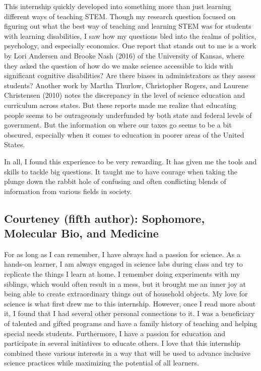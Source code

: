 \documentclass[11.5pt]{sig-alternate}
\begin{document}
\begin{large}
This internship quickly developed into something more than just learning different ways of teaching STEM. Though my research question focused on figuring out what the best way of teaching and learning STEM was for students with learning disabilities, I saw how my questions bled into the realms of politics, psychology, and especially economics. One report that stands out to me is a work by Lori Andersen and Brooke Nash (2016) of the University of Kansas, where they asked the question of how do we make science accessible to kids with significant cognitive disabilities? Are there biases in administrators as they assess students? Another work by Martha Thurlow, Christopher Rogers, and Laurene Christensen (2010) notes the discrepancy in the level of science education and curriculum across states. But these reports made me realize that educating people seems to be outrageously underfunded by both state and federal levels of government. But the information on where our taxes go seems to be a bit obscured, especially when it comes to education in poorer areas of the United States. 

In all, I found this experience to be very rewarding. It has given me the tools and skills to tackle big questions. It taught me to have courage when taking the plunge down the rabbit hole of confusing and often conflicting blends of information from various fields in society. 

\subsection*{Courteney (fifth author): Sophomore, Molecular Bio, and Medicine}

For as long as I can remember, I have always had a passion for science. As a hands-on learner, I am always engaged in science labs during class and try to replicate the things I learn at home. I remember doing experiments with my siblings, which would often result in a mess, but it brought me an inner joy at being able to create extraordinary things out of household objects. My love for science is what first drew me to this internship. However, once I read more about it, I found that I had several other personal connections to it. I was a beneficiary of talented and gifted programs and have a family history of teaching and helping special needs students. Furthermore, I have a passion for education and participate in several initiatives to educate others. I love that this internship combined these various interests in a way that will be used to advance inclusive science practices while maximizing the potential of all learners.


\end{large}
\end{document}
